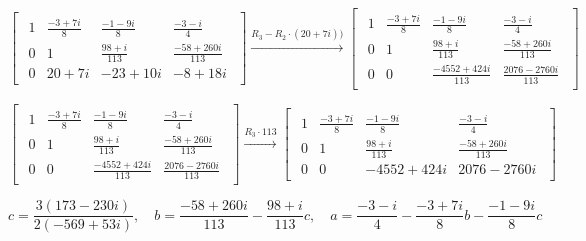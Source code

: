 \documentclass{article}
\begin{document}
\begin{equation}
\begin{bmatrix}
\begin{array}{ccc|c}
1 & \frac{-3+7i}{8} & \frac{-1-9i}{8} & \frac{-3-i}{4}\\ 
0 & 1 & \frac{98+i}{113} & \frac{-58+260i}{113}\\
0 & 20+7i & -23+10i & -8+18i\nonumber
\end{array}
\end{bmatrix}
\xrightarrow{R_3-R_2\cdot(20+7i))}
\begin{bmatrix}
\begin{array}{ccc|c}
1 & \frac{-3+7i}{8} & \frac{-1-9i}{8} & \frac{-3-i}{4}\\ 
0 & 1 & \frac{98+i}{113} & \frac{-58+260i}{113}\\
0 & 0 & \frac{-4552+424i}{113} & \frac{2076-2760i}{113}\nonumber
\end{array}
\end{bmatrix}
\end{equation}

\begin{equation}
\begin{bmatrix}
\begin{array}{ccc|c}
1 & \frac{-3+7i}{8} & \frac{-1-9i}{8} & \frac{-3-i}{4}\\ 
0 & 1 & \frac{98+i}{113} & \frac{-58+260i}{113}\\
0 & 0 & \frac{-4552+424i}{113} & \frac{2076-2760i}{113}\nonumber
\end{array}
\end{bmatrix}
\xrightarrow{R_3\cdot113}
\begin{bmatrix}
\begin{array}{ccc|c}
1 & \frac{-3+7i}{8} & \frac{-1-9i}{8} & \frac{-3-i}{4}\\ 
0 & 1 & \frac{98+i}{113} & \frac{-58+260i}{113}\\
0 & 0 & -4552+424i & 2076-2760i\nonumber
\end{array}
\end{bmatrix}
\end{equation}


\begin{equation}
    c = \frac{3(173-230i)}{2(-569+53i)},\quad 
    b = \frac{-58+260i}{113} - \frac{98+i}{113}c,\quad
    a = \frac{-3-i}{4} - \frac{-3+7i}{8}b - \frac{-1-9i}{8}c
    \nonumber
\end{equation}
\end{document}
